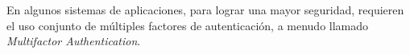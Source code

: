 En algunos sistemas de aplicaciones, para lograr una mayor seguridad, requieren el uso conjunto de múltiples factores de autenticación, a menudo llamado \textit{Multifactor Authentication}.


%
%
%
%

